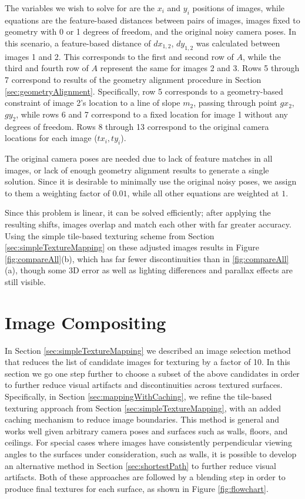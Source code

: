 \documentclass[]{spie}  %
\begin{document}
The variables we wish to solve for are the $x_i$ and $y_i$ positions
of images, while equations are the feature-based distances between
pairs of images, images fixed to geometry with 0 or 1 degrees of
freedom, and the original noisy camera poses. In this scenario, a
feature-based distance of $dx_{1,2}$, $dy_{1,2}$ was calculated
between images 1 and 2. This corresponds to the first and second row
of $A$, while the third and fourth row of $A$ represent the same for
images 2 and 3. Rows 5 through 7 correspond to results of the geometry
alignment procedure in Section
\ref{sec:geometryAlignment}. Specifically, row 5 corresponds to a
geometry-based constraint of image 2's location to a line of slope
$m_2$, passing through point $gx_2$, $gy_2$, while rows 6 and 7
correspond to a fixed location for image 1 without any degrees of
freedom. Rows 8 through 13 correspond to the original camera locations
for each image ($tx_i,ty_i$).

The original camera poses are needed due to lack of feature matches in
all images, or lack of enough geometry alignment results to generate a
single solution. Since it is desirable to minimally use the original
noisy poses, we assign to them a weighting factor of $0.01$, while all
other equations are weighted at $1$.


Since this problem is linear, it can be solved efficiently; after
applying the resulting shifts, images overlap and match each other
with far greater accuracy. Using the simple tile-based texturing
scheme from Section \ref{sec:simpleTextureMapping} on these adjusted
images results in Figure \ref{fig:compareAll}(b), which has far fewer
discontinuities than in \ref{fig:compareAll}(a), though some 3D error
as well as lighting differences and parallax effects are still
visible.

\section{Image Compositing}
\label{sec:imageCompositing}
In Section \ref{sec:simpleTextureMapping} we described an image
selection method that reduces the list of candidate images for
texturing by a factor of 10. In this section we go one step further to
choose a subset of the above candidates in order to further reduce
visual artifacts and discontinuities across textured
surfaces. Specifically, in Section \ref{sec:mappingWithCaching}, we
refine the tile-based texturing approach from Section
\ref{sec:simpleTextureMapping}, with an added caching mechanism to
reduce image boundaries. This method is general and works well given
arbitrary camera poses and surfaces such as walls, floors, and
ceilings. For special cases where images have consistently
perpendicular viewing angles to the surfaces under consideration, such
as walls, it is possible to develop an alternative method in Section
\ref{sec:shortestPath} to further reduce visual artifacts. Both of
these approaches are followed by a blending step in order to produce
final textures for each surface, as shown in Figure
\ref{fig:flowchart}.
\end{document}
